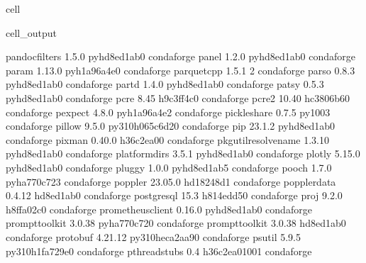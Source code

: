 \documentclass[letterpaper,table,10pt,english]{jupyterBook}
\begin{document}
\begin{sphinxuseclass}{cell}
\begin{sphinxVerbatimOutput}
\begin{sphinxuseclass}{cell_output}
\begin{sphinxVerbatim}[commandchars=\\\{\}]
pandocfilters             1.5.0              pyhd8ed1ab\PYGZus{}0    conda\PYGZhy{}forge
panel                     1.2.0              pyhd8ed1ab\PYGZus{}0    conda\PYGZhy{}forge
param                     1.13.0             pyh1a96a4e\PYGZus{}0    conda\PYGZhy{}forge
parquet\PYGZhy{}cpp               1.5.1                         2    conda\PYGZhy{}forge
parso                     0.8.3              pyhd8ed1ab\PYGZus{}0    conda\PYGZhy{}forge
partd                     1.4.0              pyhd8ed1ab\PYGZus{}0    conda\PYGZhy{}forge
patsy                     0.5.3              pyhd8ed1ab\PYGZus{}0    conda\PYGZhy{}forge
pcre                      8.45                 h9c3ff4c\PYGZus{}0    conda\PYGZhy{}forge
pcre2                     10.40                hc3806b6\PYGZus{}0    conda\PYGZhy{}forge
pexpect                   4.8.0              pyh1a96a4e\PYGZus{}2    conda\PYGZhy{}forge
pickleshare               0.7.5                   py\PYGZus{}1003    conda\PYGZhy{}forge
pillow                    9.5.0           py310h065c6d2\PYGZus{}0    conda\PYGZhy{}forge
pip                       23.1.2             pyhd8ed1ab\PYGZus{}0    conda\PYGZhy{}forge
pixman                    0.40.0               h36c2ea0\PYGZus{}0    conda\PYGZhy{}forge
pkgutil\PYGZhy{}resolve\PYGZhy{}name      1.3.10             pyhd8ed1ab\PYGZus{}0    conda\PYGZhy{}forge
platformdirs              3.5.1              pyhd8ed1ab\PYGZus{}0    conda\PYGZhy{}forge
plotly                    5.15.0             pyhd8ed1ab\PYGZus{}0    conda\PYGZhy{}forge
pluggy                    1.0.0              pyhd8ed1ab\PYGZus{}5    conda\PYGZhy{}forge
pooch                     1.7.0              pyha770c72\PYGZus{}3    conda\PYGZhy{}forge
poppler                   23.05.0              hd18248d\PYGZus{}1    conda\PYGZhy{}forge
poppler\PYGZhy{}data              0.4.12               hd8ed1ab\PYGZus{}0    conda\PYGZhy{}forge
postgresql                15.3                 h814edd5\PYGZus{}0    conda\PYGZhy{}forge
proj                      9.2.0                h8ffa02c\PYGZus{}0    conda\PYGZhy{}forge
prometheus\PYGZus{}client         0.16.0             pyhd8ed1ab\PYGZus{}0    conda\PYGZhy{}forge
prompt\PYGZhy{}toolkit            3.0.38             pyha770c72\PYGZus{}0    conda\PYGZhy{}forge
prompt\PYGZus{}toolkit            3.0.38               hd8ed1ab\PYGZus{}0    conda\PYGZhy{}forge
protobuf                  4.21.12         py310heca2aa9\PYGZus{}0    conda\PYGZhy{}forge
psutil                    5.9.5           py310h1fa729e\PYGZus{}0    conda\PYGZhy{}forge
pthread\PYGZhy{}stubs             0.4               h36c2ea0\PYGZus{}1001    conda\PYGZhy{}forge

\end{sphinxVerbatim}
\end{sphinxuseclass}
\end{sphinxVerbatimOutput}
\end{sphinxuseclass}
\end{document}
